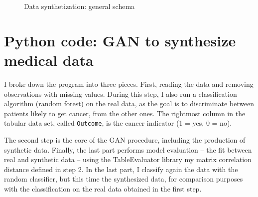 \documentclass[oneside,10pt]{book}
\begin{document}
\begin{figure}[H]
{
} %
\caption{Data synthetization: general schema} \label{fig:digdig}
\end{figure}


\section{Python code: GAN to synthesize medical data}\label{pyganvg}

I broke down the program into three pieces. First, reading the data and removing observations with missing values. During this step, I also run a classification algorithm (random forest) on the real data, as the goal is to discriminate between patients likely to get cancer, from the other ones.
 The rightmost column in the tabular data set, called \texttt{Outcome}, is the cancer indicator (1 = yes, 0 = no).

The second step is the core of the GAN procedure, including the production of synthetic data. Finally, the last part performs model evaluation   -- the fit between real and synthetic data -- using the TableEvaluator library my matrix correlation distance defined in step 2. In the last part, I classify again the data with the random classifier, but this time the synthesized data, for comparison purposes with the classification on the real data obtained in the first step.
\end{document}
